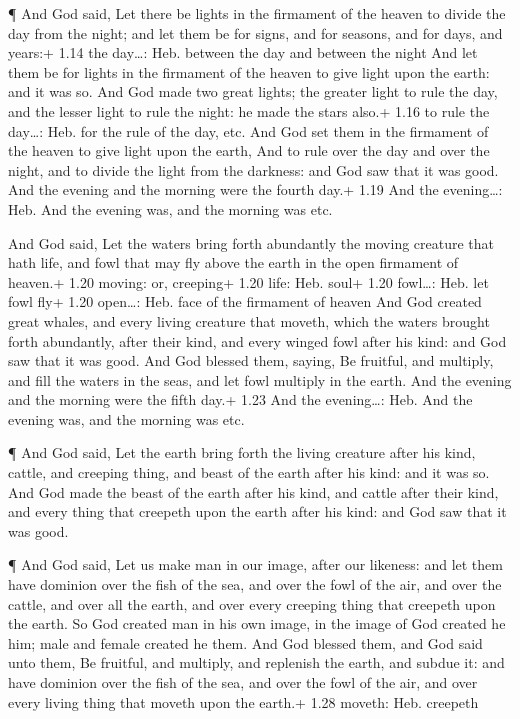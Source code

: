  ¶ And God said, Let there be lights in the firmament of
the heaven to divide the day from the night; and let them be for signs,
and for seasons, and for days, and years:+ 1.14 the day\ldots: Heb.
between the day and between the night  And let them be for
lights in the firmament of the heaven to give light upon the earth: and
it was so.  And God made two great lights; the greater
light to rule the day, and the lesser light to rule the night: he made
the stars also.+ 1.16 to rule the day\ldots: Heb. for the rule of the
day, etc.  And God set them in the firmament of the heaven
to give light upon the earth,  And to rule over the day and
over the night, and to divide the light from the darkness: and God saw
that it was good.  And the evening and the morning were the
fourth day.+ 1.19 And the evening\ldots: Heb. And the evening was, and
the morning was etc.

 And God said, Let the waters bring forth abundantly the
moving creature that hath life, and fowl that may fly above the earth in
the open firmament of heaven.+ 1.20 moving: or, creeping+ 1.20 life:
Heb. soul+ 1.20 fowl\ldots: Heb. let fowl fly+ 1.20 open\ldots: Heb.
face of the firmament of heaven  And God created great
whales, and every living creature that moveth, which the waters brought
forth abundantly, after their kind, and every winged fowl after his
kind: and God saw that it was good.  And God blessed them,
saying, Be fruitful, and multiply, and fill the waters in the seas, and
let fowl multiply in the earth.  And the evening and the
morning were the fifth day.+ 1.23 And the evening\ldots: Heb. And the
evening was, and the morning was etc.

 ¶ And God said, Let the earth bring forth the living
creature after his kind, cattle, and creeping thing, and beast of the
earth after his kind: and it was so.  And God made the
beast of the earth after his kind, and cattle after their kind, and
every thing that creepeth upon the earth after his kind: and God saw
that it was good.

 ¶ And God said, Let us make man in our image, after our
likeness: and let them have dominion over the fish of the sea, and over
the fowl of the air, and over the cattle, and over all the earth, and
over every creeping thing that creepeth upon the earth.  So
God created man in his own image, in the image of God created he him;
male and female created he them.  And God blessed them, and
God said unto them, Be fruitful, and multiply, and replenish the earth,
and subdue it: and have dominion over the fish of the sea, and over the
fowl of the air, and over every living thing that moveth upon the
earth.+ 1.28 moveth: Heb. creepeth

